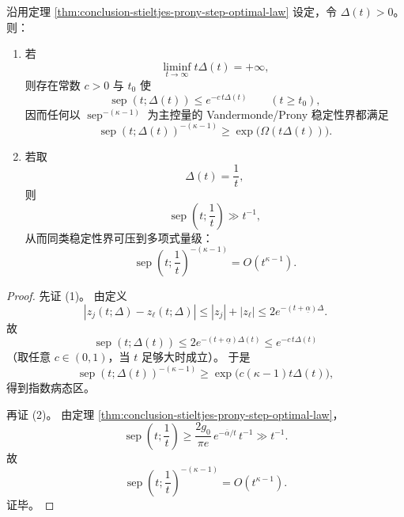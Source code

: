 \begin{theorem}\label{thm:conclusion-prony-step-conditioning-dichotomy}
沿用定理 \ref{thm:conclusion-stieltjes-prony-step-optimal-law} 设定，令 \(\Delta(t)>0\)。
则：
\begin{enumerate}
  \item 若
  \[
  \liminf_{t\to\infty}t\Delta(t)=+\infty,
  \]
  则存在常数 \(c>0\) 与 \(t_0\) 使
  \[
  \operatorname{sep}(t;\Delta(t))\le e^{-c\,t\Delta(t)}
  \qquad (t\ge t_0),
  \]
  因而任何以 \(\operatorname{sep}^{-(\kappa-1)}\) 为主控量的 Vandermonde/Prony 稳定性界都满足
  \[
  \operatorname{sep}(t;\Delta(t))^{-(\kappa-1)}
  \ge
  \exp\!\bigl(\Omega(t\Delta(t))\bigr).
  \]
  \item 若取
  \[
  \Delta(t)=\frac1t,
  \]
  则
  \[
  \operatorname{sep}\!\left(t;\frac1t\right)\gg t^{-1},
  \]
  从而同类稳定性界可压到多项式量级：
  \[
  \operatorname{sep}\!\left(t;\frac1t\right)^{-(\kappa-1)}
  =O\!\left(t^{\kappa-1}\right).
  \]
\end{enumerate}
\end{theorem}
\begin{proof}
先证 (1)。
由定义
\[
|z_j(t;\Delta)-z_\ell(t;\Delta)|
\le
|z_j|+|z_\ell|
\le
2e^{-(t+\underline\alpha)\Delta}.
\]
故
\[
\operatorname{sep}(t;\Delta(t))
\le
2e^{-(t+\underline\alpha)\Delta(t)}
\le
e^{-c\,t\Delta(t)}
\]
（取任意 \(c\in(0,1)\)，当 \(t\) 足够大时成立）。
于是
\[
\operatorname{sep}(t;\Delta(t))^{-(\kappa-1)}
\ge
\exp\!\bigl(c(\kappa-1)t\Delta(t)\bigr),
\]
得到指数病态区。

再证 (2)。
由定理 \ref{thm:conclusion-stieltjes-prony-step-optimal-law}，
\[
\operatorname{sep}\!\left(t;\frac1t\right)
\ge
\frac{2g_0}{\pi e}\,e^{-\overline\alpha/t}\,t^{-1}
\gg t^{-1}.
\]
故
\[
\operatorname{sep}\!\left(t;\frac1t\right)^{-(\kappa-1)}
=
O\!\left(t^{\kappa-1}\right).
\]
证毕。
\end{proof}
